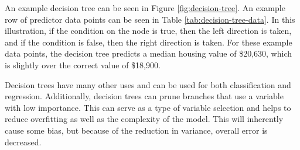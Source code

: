 \documentclass{article}
\begin{document}
An example decision tree can be seen in Figure \ref{fig:decision-tree}. An example row of predictor data points can be seen in Table \ref{tab:decision-tree-data}. In this illustration, if the condition on the node is true, then the left direction is taken, and if the condition is false, then the right direction is taken. For these example data points, the decision tree predicts a median housing value of \$20,630, which is slightly over the correct value of \$18,900.

Decision trees have many other uses and can be used for both classification and regression. Additionally, decision trees can prune branches that use a variable with low importance. This can serve as a type of variable selection and helps to reduce overfitting as well as the complexity of the model. This will inherently cause some bias, but because of the reduction in variance, overall error is decreased.
\end{document}
